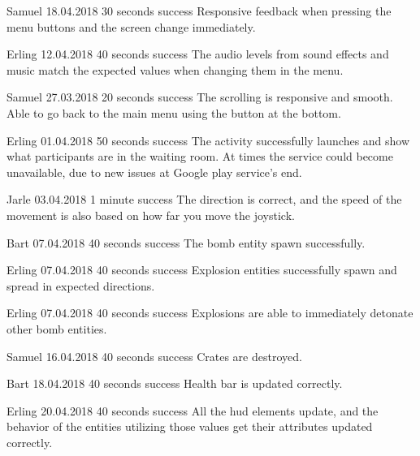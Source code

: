 {Samuel}
{18.04.2018}
{30 seconds}
{success}
{Responsive feedback when pressing the menu buttons and the screen change immediately.}

{Erling}
{12.04.2018}
{40 seconds}
{success}
{The audio levels from sound effects and music match the expected values when changing them in the menu.}

{Samuel}
{27.03.2018}
{20 seconds}
{success}
{The scrolling is responsive and smooth. Able to go back to the main menu using the button at the bottom.}

{Erling}
{01.04.2018}
{50 seconds}
{success}
{The activity successfully launches and show what participants are in the waiting room. At times the service could become unavailable, due to new issues at Google play service’s end.}

{Jarle}
{03.04.2018}
{1 minute}
{success}
{The direction is correct, and the speed of the movement is also based on how far you move the joystick.}

{Bart}
{07.04.2018}
{40 seconds}
{success}
{The bomb entity spawn successfully.}

{Erling}
{07.04.2018}
{40 seconds}
{success}
{Explosion entities successfully spawn and spread in expected directions.}

{Erling}
{07.04.2018}
{40 seconds}
{success}
{Explosions are able to immediately detonate other bomb entities.}

{Samuel}
{16.04.2018}
{40 seconds}
{success}
{Crates are destroyed.}

{Bart}
{18.04.2018}
{40 seconds}
{success}
{Health bar is updated correctly.}

{Erling}
{20.04.2018}
{40 seconds}
{success}
{All the \gls{hud} elements update, and the behavior of the entities utilizing those values get their attributes updated correctly.}

